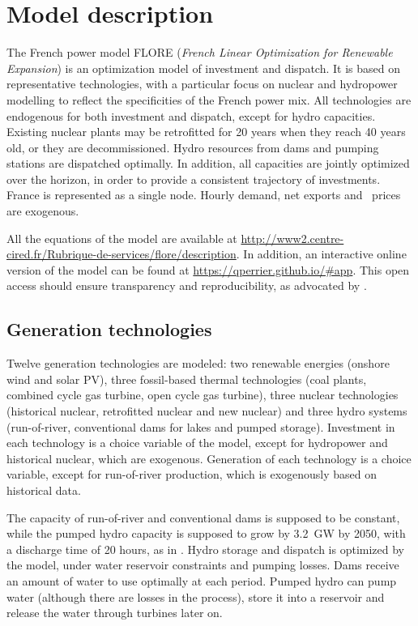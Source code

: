 \section{Model description} \label{sec:modelDescription}

The French power model FLORE (\textit{French Linear Optimization for Renewable Expansion}) is an optimization model of investment and dispatch. It is based on representative technologies, with a particular focus on nuclear and hydropower modelling to reflect the specificities of the French power mix. All technologies are endogenous for both investment and dispatch, except for hydro capacities. Existing nuclear plants may be retrofitted for 20 years when they reach 40 years old, or they are decommissioned. Hydro resources from dams and pumping stations are dispatched optimally. In addition, all capacities are jointly optimized over the horizon, in order to provide a consistent trajectory of investments. France is represented as a single node. Hourly demand, net exports and \coo\ prices are exogenous. 

All the equations of the model are available at \url{http://www2.centre-cired.fr/Rubrique-de-services/flore/description}. In addition, an interactive online version of the model can be found at \url{https://qperrier.github.io/#app}. This open access should ensure transparency and reproducibility, as advocated by \citet{Pfenninger2017}.

\subsection{Generation technologies}

Twelve generation technologies are modeled: two renewable energies (onshore wind and solar PV), three fossil-based thermal technologies (coal plants, combined cycle gas turbine, open cycle gas turbine), three nuclear technologies (historical nuclear, retrofitted nuclear and new nuclear) and three hydro systems (run-of-river, conventional dams for lakes and pumped storage).
Investment in each technology is a choice variable of the model, except for hydropower and historical nuclear, which are exogenous.
Generation of each technology is a choice variable, except for run-of-river production, which is exogenously based on historical data.

The capacity of run-of-river and conventional dams is supposed to be constant, while the pumped hydro capacity is supposed to grow by 3.2~GW by 2050, with a discharge time of 20 hours, as in \citet{ADEME2013}.
Hydro storage and dispatch is optimized by the model, under water reservoir constraints and pumping losses.
Dams receive an amount of water to use optimally at each period.
Pumped hydro can pump water (although there are losses in the process), store it into a reservoir and release the water through turbines later on.

